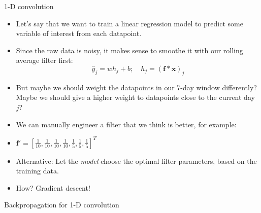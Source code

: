 \begin{vbframe}{1-D convolution}

\vfill

\begin{itemize}
	\item Let's say that we want to train a linear regression model to predict some variable of interest from each datapoint.
	\item Since the raw data is noisy, it makes sense to smoothe it with our rolling average filter first:
	$$\hat{y}_j = wh_j + b; \quad h_j = (\mathbf{f} * \mathbf{x})_j$$
	\item But maybe we should weight the datapoints in our 7-day window differently? Maybe we should give a higher weight to datapoints close to the current day $j$?
	\item We can manually engineer a filter that we think is better, for example:
	\item $\mathbf{f}' = [\frac{1}{10}, \frac{1}{10}, \frac{1}{10}, \frac{1}{10}, \frac{1}{5}, \frac{1}{5}, \frac{1}{5}]^T$
	\item Alternative: Let the \textit{model} choose the optimal filter parameters, based on the training data.
	\item How? Gradient descent!
\end{itemize}

\vfill

\end{vbframe}


\begin{vbframe}{Backpropagation for 1-D convolution}

\vfill


\vfill

\end{vbframe}

